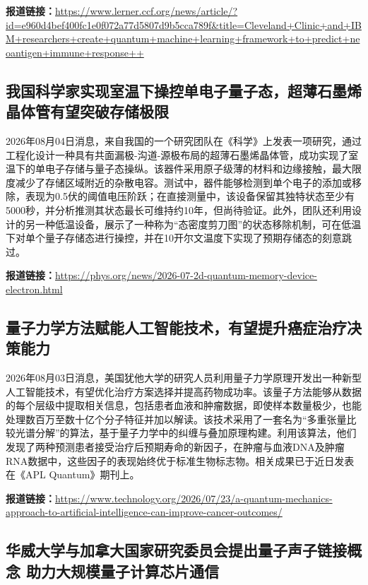 \documentclass[12pt,a4paper]{ctexart}
\begin{document}
\noindent\textbf{报道链接：}\url{https://www.lerner.ccf.org/news/article/?id=e960d4bef400fc1e0f072a77d5807d9b5cca789f\&title=Cleveland+Clinic+and+IBM+researchers+create+quantum+machine+learning+framework+to+predict+neoantigen+immune+response++}

\subsection{ 我国科学家实现室温下操控单电子量子态，超薄石墨烯晶体管有望突破存储极限 }

2026年08月04日消息，来自我国的一个研究团队在《科学》上发表一项研究，通过工程化设计一种具有共面漏极-沟道-源极布局的超薄石墨烯晶体管，成功实现了室温下的单电子存储与量子态操纵。该器件采用原子级薄的材料和边缘接触，最大限度减少了存储区域附近的杂散电容。测试中，器件能够检测到单个电子的添加或移除，表现为0.5伏的阈值电压阶跃；在直接测量中，该设备保留其独特状态至少有5000秒，并分析推测其状态最长可维持约10年，但尚待验证。此外，团队还利用设计的另一种低温设备，展示了一种称为“态密度剪刀图”的状态移除机制，可在低温下对单个量子存储态进行操控，并在10开尔文温度下实现了预期存储态的刻意跳过。

\noindent\textbf{报道链接：}\url{https://phys.org/news/2026-07-2d-quantum-memory-device-electron.html}

\subsection{ 量子力学方法赋能人工智能技术，有望提升癌症治疗决策能力 }

2026年08月03日消息，美国犹他大学的研究人员利用量子力学原理开发出一种新型人工智能技术，有望优化治疗方案选择并提高药物成功率。该量子方法能够从数据的每个层级中提取相关信息，包括患者血液和肿瘤数据，即使样本数量极少，也能处理数百万至数十亿个分子特征并加以解读。该技术采用了一套名为“多重张量比较光谱分解”的算法，基于量子力学中的纠缠与叠加原理构建。利用该算法，他们发现了两种预测患者接受治疗后预期寿命的新因子，在肿瘤与血液DNA及肿瘤RNA数据中，这些因子的表现始终优于标准生物标志物。相关成果已于近日发表在《APL Quantum》期刊上。

\noindent\textbf{报道链接：}\url{https://www.technology.org/2026/07/23/a-quantum-mechanics-approach-to-artificial-intelligence-can-improve-cancer-outcomes/}

\subsection{ 华威大学与加拿大国家研究委员会提出量子声子链接概念 助力大规模量子计算芯片通信 }
\end{document}
